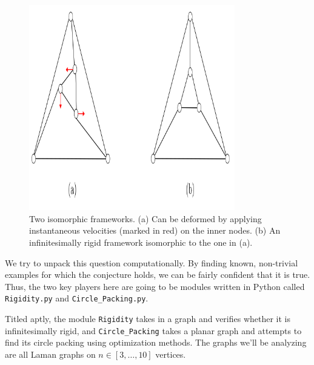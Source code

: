 \begin{figure}[htbp]
    \centering
    \includegraphics[width = 0.8\textwidth]{Chapter 4/2. Isomorphic but not inf rigid.png}
    \caption{Two isomorphic frameworks. (a) Can be deformed by applying instantaneous velocities (marked in red) on the inner nodes. (b) An infinitesimally rigid framework isomorphic to the one in (a).}
    \label{fig4: iso but not rig}
\end{figure}
\vspace{-3mm}
\begin{flushleft}
We try to unpack this question computationally. By finding known, non-trivial examples for which the conjecture holds, we can be fairly confident that it is true. Thus, the two key players here are going to be modules written in Python called \texttt{Rigidity.py} and \texttt{Circle\_Packing.py}. 
\end{flushleft}

\begin{flushleft}
Titled aptly, the module \texttt{Rigidity} takes in a graph and verifies whether it is infinitesimally rigid, and \texttt{Circle\_Packing} takes a planar graph and attempts to find its circle packing using optimization methods. The graphs we'll be analyzing are all Laman graphs on $n \in [3, \hdots, 10]$ vertices.  
\end{flushleft}

